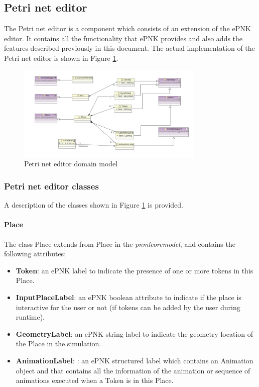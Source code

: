 \subsection{Petri net editor}

The Petri net editor is a component which consists of an extension of the ePNK editor. It contains all the functionality that ePNK provides and also adds the features described previously in this document. The actual implementation of the Petri net editor is shown in Figure \ref{fig:petri-net-domain-model}.

\begin{figure}[htp]
\begin{center}
  \includegraphics[width=0.8\textwidth]{image/petrinet_editor_domain.png}
  \caption{Petri net editor domain model}
  \label{fig:petri-net-domain-model}
\end{center}
\end{figure}

\subsubsection{Petri net editor classes}

A description of the classes shown in Figure \ref{fig:petri-net-domain-model} is provided.

\paragraph{Place}

The class Place extends from Place in the \textit{pnmlcoremodel}, and contains the following attributes:

\begin{itemize}
	\item \textbf{Token}: an ePNK label to indicate the presence of one or more tokens in this Place.
	\item \textbf{InputPlaceLabel}: an ePNK boolean attribute to indicate if the place is interactive for the user or not (if tokens can be added by the user during runtime).
	\item \textbf{GeometryLabel}: an ePNK string label to indicate the geometry location of the Place in the simulation.
	\item \textbf{AnimationLabel}: : an ePNK structured label which contains an Animation object and that contains all the information of the animation or sequence of animations executed when a Token is in this Place.
\end{itemize}

